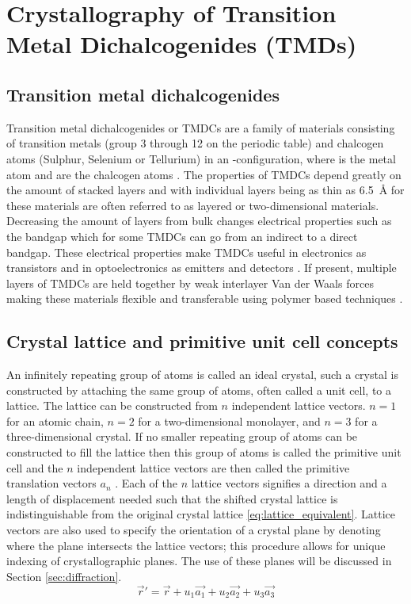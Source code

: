 \section{Crystallography of Transition Metal Dichalcogenides (TMDs)}
\subsection{Transition metal dichalcogenides}
Transition metal dichalcogenides or TMDCs are a family of materials consisting of transition metals (group 3 through 12 on the periodic table) and chalcogen atoms (Sulphur, Selenium or Tellurium) in an -configuration, where  is the metal atom and  are the chalcogen atoms \cite{C7TA04268J}.
The properties of TMDCs depend greatly on the amount of stacked layers and with individual layers being as thin as \SI{6.5}{\angstrom} for  these materials are often referred to as layered or two-dimensional materials.
Decreasing the amount of layers from bulk changes electrical properties such as the bandgap which for some TMDCs can go from an indirect to a direct bandgap.
These electrical properties make TMDCs useful in electronics as transistors and in optoelectronics as emitters and detectors \cite{emerg_photolum, LopezSanchez2013, Radisavljevic2011}. 
If present, multiple layers of TMDCs are held together by weak interlayer Van der Waals forces making these materials flexible and transferable using polymer based techniques \cite{reganEmergingExcitonPhysics2022a}.

\subsection{Crystal lattice and primitive unit cell concepts}
An infinitely repeating group of atoms is called an ideal crystal, such a crystal is constructed by attaching the same group of atoms, often called a unit cell, to a lattice.
The lattice can be constructed from $n$ independent lattice vectors. $n=1$ for an atomic chain, $n=2$ for a two-dimensional monolayer, and $n=3$ for a three-dimensional crystal.
If no smaller repeating group of atoms can be constructed to fill the lattice then this group of atoms is called the primitive unit cell and the $n$ independent lattice vectors are then called the primitive translation vectors $a_{n}$ \cite{Kittel1995-qt}.
Each of the $n$ lattice vectors signifies a direction and a length of displacement needed such that the shifted crystal lattice is indistinguishable from the original crystal lattice \ref{eq:lattice_equivalent}.
Lattice vectors are also used to specify the orientation of a crystal plane by denoting where the plane intersects the lattice vectors; this procedure allows for unique indexing of crystallographic planes. The use of these planes will be discussed in Section \ref{sec:diffraction}.
\begin{equation}
    \vec{r}' = \vec{r} + u_1 \vec{a_1} +u_2 \vec{a_2} + u_3 \vec{a_3}
    \label{eq:lattice_equivalent}
\end{equation}

